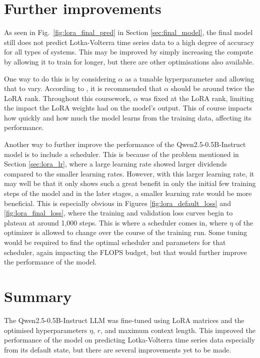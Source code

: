 \documentclass[11pt,a4paper]{article}
\begin{document}
\section{Further improvements}

As seen in Fig.~\ref{fig:lora_final_pred} in Section \ref{sec:final_model}, the final model still does not predict Lotka-Volterra time series data to a high degree of accuracy for all types of systems. This may be improved by simply increasing the compute by allowing it to train for longer, but there are other optimisations also available.

One way to do this is by considering $\alpha$ as a tunable hyperparameter and allowing that to vary. According to \citeauthor{hu2021loralowrankadaptationlarge}, it is recommended that $\alpha$ should be around twice the LoRA rank. Throughout this coursework, $\alpha$ was fixed at the LoRA rank, limiting the impact the LoRA weights had on the model's output. This of course impacts how quickly and how much the model learns from the training data, affecting its performance.

Another way to further improve the performance of the Qwen2.5-0.5B-Instruct model is to include a scheduler. This is because of the problem mentioned in Section \ref{sec:lora_lr}, where a large learning rate showed larger dividends compared to the smaller learning rates. However, with this larger learning rate, it may well be that it only shows such a great benefit in only the initial few training steps of the model and in the later stages, a smaller learning rate would be more beneficial. This is especially obvious in Figures \ref{fig:lora_default_loss} and \ref{fig:lora_final_loss}, where the training and validation loss curves begin to plateau at around 1,000 steps. This is where a scheduler comes in, where $\eta$ of the optimizer is allowed to change over the course of the training run. Some tuning would be required to find the optimal scheduler and parameters for that scheduler, again impacting the FLOPS budget, but that would further improve the performance of the model.

\section{Summary}
The Qwen2.5-0.5B-Instruct LLM was fine-tuned using LoRA matrices and the optimised hyperparameters $\eta$, $r$, and maximum context length. This improved the performance of the model on predicting Lotka-Volterra time series data especially from its default state, but there are several improvements yet to be made.
\end{document}
